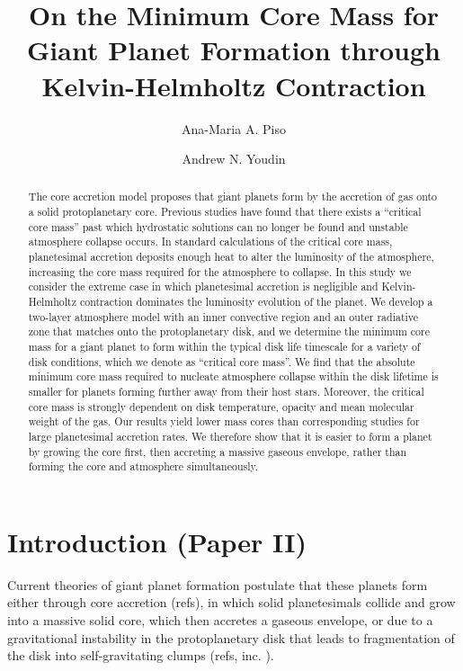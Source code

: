 \documentclass[apj]{emulateapj}
\begin{document}



\title{On the Minimum Core Mass for Giant Planet Formation through Kelvin-Helmholtz Contraction}
\author{Ana-Maria A. Piso}
\author{Andrew N. Youdin}

\begin{abstract}
The core accretion model proposes that giant planets form by the accretion of gas onto a solid protoplanetary core. Previous studies have found that there exists a ``critical core mass'' past which hydrostatic solutions can no longer be found and unstable atmosphere collapse occurs. In standard calculations of the critical core mass, planetesimal accretion deposits enough heat to alter the luminosity of the atmosphere, increasing the core mass required for the atmosphere to collapse. In this study we consider the extreme case in which planetesimal accretion is negligible and Kelvin-Helmholtz contraction dominates the luminosity evolution of the planet. We develop a two-layer atmosphere model with an inner convective region and an outer radiative zone that matches onto the protoplanetary disk, and we determine the minimum core mass for a giant planet to form within the typical disk life timescale for a variety of disk conditions, which we denote as  ``critical core mass''.  We find that the absolute minimum core mass required to nucleate atmosphere collapse within the disk lifetime is smaller for planets forming further away from their host stars. Moreover, the critical core mass is strongly dependent on disk temperature, opacity and mean molecular weight of the gas. Our results yield lower mass cores than corresponding studies for large planetesimal accretion rates. We therefore show that it is easier to form a planet by growing the core first, then accreting a massive gaseous envelope, rather than forming the core and atmosphere simultaneously.

\end{abstract}

\section{Introduction \textbf{(Paper II)}}
\label{intro}

Current theories of giant planet formation postulate that these planets form either through core accretion (refs), in which solid planetesimals collide and grow into a massive solid core, which then accretes a gaseous envelope, or due to a gravitational instability in the protoplanetary disk that leads to fragmentation of the disk into self-gravitating clumps (refs, inc. \citealt{dangelo11}).  %
\end{document}
